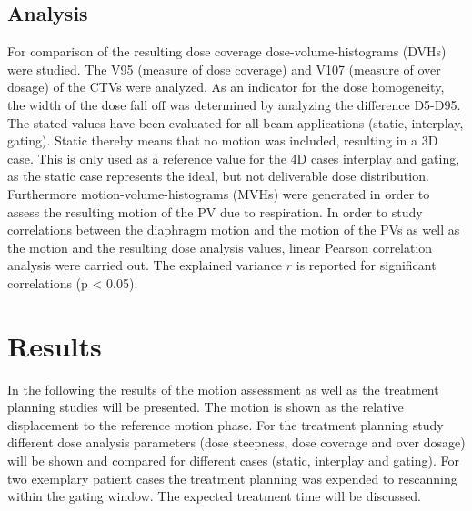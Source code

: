 \documentclass[type=dr, dr=rernat, accentcolor=tud7b,colorbacktitle, bigchapter, openright, twoside, 12pt ]{tudthesis}
\begin{document}
\subsection{Analysis}

For comparison of the resulting dose coverage dose-volume-histograms (DVHs) were studied. The V95 (measure of dose coverage) and V107 (measure 
of over dosage) of the CTVs were analyzed. As an indicator for the dose homogeneity, the width of the dose fall off was determined by analyzing 
the difference D5-D95. The stated values have been evaluated for all beam applications (static, interplay, gating). Static thereby means that 
no motion was included, resulting in a 3D case. This is only used as a reference value for the 4D cases interplay and gating, as the static 
case represents the ideal, but not deliverable dose distribution. Furthermore motion-volume-histograms (MVHs) were generated in order to 
assess the resulting motion of the PV due to respiration. \newline
\newline
In order to study correlations between the diaphragm motion and the motion of the PVs as well as the motion and the resulting dose analysis 
values, linear Pearson correlation analysis were carried out. 
The explained variance $r$ is reported for significant correlations (p < 0.05). 

\newpage

\section{Results}

In the following the results of the motion assessment as well as the treatment planning studies will be presented. 
The motion is shown as the relative displacement to the reference motion phase. 
For the treatment planning study different dose analysis parameters (dose steepness, dose coverage and over dosage) will be shown 
and compared for different cases (static, interplay and gating). For two exemplary patient cases the treatment planning was 
expended to rescanning within the gating window. The expected treatment time will be discussed. 
\end{document}
